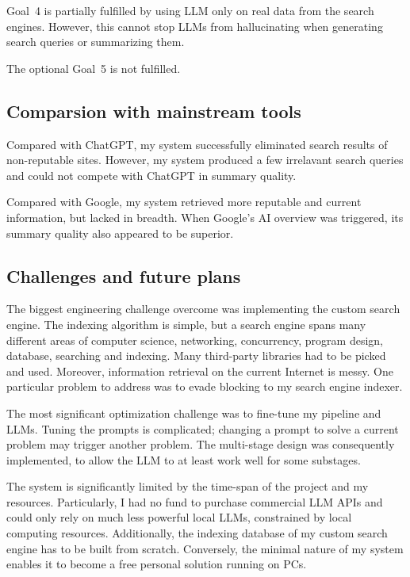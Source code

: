 \documentclass[final-report]{report-template}
\begin{document}
Goal~4 is partially fulfilled by using LLM only on real data from the search
engines. However, this cannot stop LLMs from hallucinating when generating
search queries or summarizing them.

The optional Goal~5 is not fulfilled.

\subsection{Comparsion with mainstream tools}
Compared with ChatGPT, my system successfully eliminated search results of
non-reputable sites. However, my system produced a few irrelavant search
queries and could not compete with ChatGPT in summary quality.

Compared with Google, my system retrieved more reputable and current
information, but lacked in breadth. When Google's AI overview was triggered,
its summary quality also appeared to be superior.

\subsection{Challenges and future plans}
The biggest engineering challenge overcome was implementing the custom search
engine. The indexing algorithm is simple, but a search engine spans
many different areas of computer science, networking, concurrency, program
design, database, searching and indexing. Many third-party libraries had to be
picked and used. Moreover, information retrieval on the current Internet is
messy. One particular problem to address was to evade blocking to my search
engine indexer.

The most significant optimization challenge was to fine-tune my pipeline and
LLMs. Tuning the prompts is complicated; changing a prompt to solve a current
problem may trigger another problem. The multi-stage design was consequently
implemented, to allow the LLM to at least work well for some substages.

The system is significantly limited by the time-span of the project and my
resources. Particularly, I had no fund to purchase commercial LLM APIs and
could only rely on much less powerful local LLMs, constrained by local
computing resources. Additionally, the indexing database of my custom search
engine has to be built from scratch. Conversely, the minimal nature of my
system enables it to become a free personal solution running on PCs.
\end{document}
